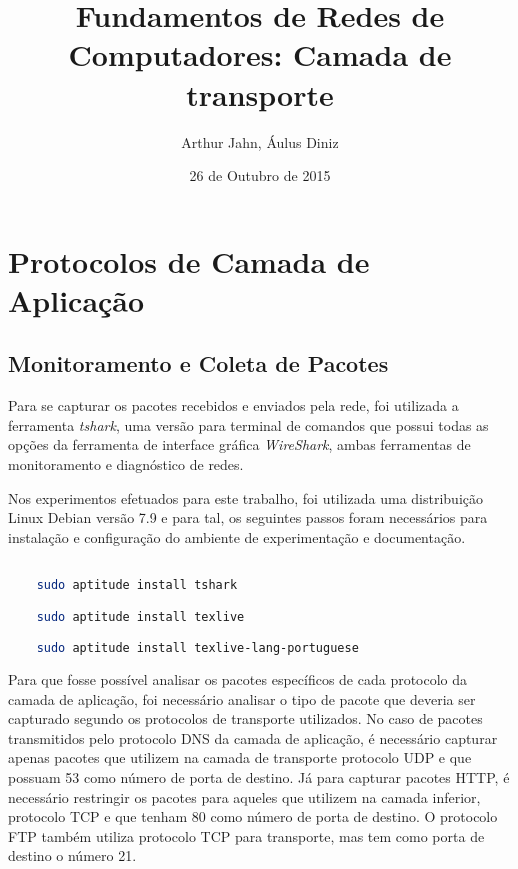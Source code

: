 \documentclass[a4paper]{report} %
\title{Fundamentos de Redes de Computadores: Camada de transporte}
\author{Arthur Jahn, Áulus Diniz}
\date{26 de Outubro de 2015}    %
\begin{document}
\maketitle  %

\tableofcontents %
\chapter{Protocolos de Camada de Aplicação}
\label{chap_primeiro} %

\section{Monitoramento e Coleta de Pacotes}
\label{sec_primeiro_monitoramento}

	Para	se capturar os pacotes recebidos e enviados pela rede, foi utilizada a ferramenta \textit{tshark}, uma versão para terminal de comandos que possui todas as opções da ferramenta de interface gráfica \textit{WireShark}, ambas ferramentas de monitoramento e diagnóstico de redes.

	Nos experimentos efetuados para este trabalho, foi utilizada uma distribuição Linux Debian versão 7.9 e para tal, os seguintes passos foram necessários para instalação e configuração do ambiente de experimentação e documentação.
\begin{lstlisting}[language=bash]

	sudo aptitude install tshark

	sudo aptitude install texlive

	sudo aptitude install texlive-lang-portuguese


\end{lstlisting}

	Para que fosse possível analisar os pacotes específicos de cada protocolo da camada de aplicação, foi necessário analisar o tipo de pacote que deveria ser capturado segundo os protocolos de transporte utilizados. No caso de pacotes transmitidos pelo protocolo DNS da camada de aplicação, é necessário capturar apenas pacotes que utilizem na camada de transporte protocolo UDP e que possuam 53 como número de porta de destino. Já para capturar pacotes HTTP, é necessário restringir os pacotes para aqueles que utilizem na camada inferior, protocolo TCP e que tenham 80 como número de porta de destino. O protocolo FTP
também utiliza protocolo TCP para transporte, mas tem como porta de destino o número 21.
\end{document}

